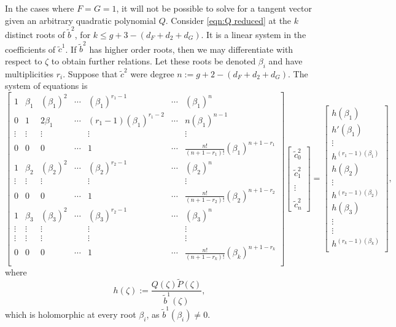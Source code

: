 In the cases where $F=G=1$, it will not be possible to solve for a tangent vector given an arbitrary quadratic polynomial $Q$. Consider \eqref{eqn:Q reduced} at the $k$ distinct roots of $\tilde{b}^2$, for $k \leq g + 3 - (d_F + d_2 + d_G)$. It is a linear system in the coefficients of $\tilde{c}^1$. If $\tilde{b}^2$ has higher order roots, then we may differentiate with respect to $ζ$ to obtain further relations. Let these roots be denoted $β_i$ and have multiplicities $r_i$. Suppose that $\tilde{c}^2$ were degree $n := g + 2 - (d_F + d_2 + d_G)$. The system of equations is
\[
\begin{bmatrix}
1 & β_1 & (β_1)^2 & \cdots & (β_1)^{r_1-1} & \cdots & (β_1)^{n} \\
0 & 1 & 2β_1 & \cdots & (r_1-1)(β_1)^{r_1-2} & \cdots & n(β_1)^{n-1} \\
\vdots & \vdots & \vdots & & \vdots & & \vdots \\
0 & 0 & 0 & \cdots & 1 & \cdots & \frac{n!}{(n+1 - r_1)!}(β_1)^{n+1-r_1} \\
1 & β_2 & (β_2)^2 & \cdots & (β_2)^{r_2-1} & \cdots & (β_2)^{n} \\
\vdots & \vdots & \vdots & & \vdots & & \vdots \\
0 & 0 & 0 & \cdots & 1 & \cdots & \frac{n!}{(n+1 - r_2)!}(β_2)^{n+1-r_2} \\
1 & β_3 & (β_3)^2 & \cdots & (β_3)^{r_2-1} & \cdots & (β_3)^{n} \\
\vdots & \vdots & \vdots & & \vdots & & \vdots \\
\vdots & \vdots & \vdots & & \vdots & & \vdots \\
0 & 0 & 0 & \cdots & 1 & \cdots & \frac{n!}{(n+1 - r_k)!}(β_k)^{n+1-r_k} \\
\end{bmatrix}
\begin{bmatrix}
\tilde{c}^2_0 \\~\\ \tilde{c}^2_1 \\~\\ \vdots \\~\\ \tilde{c}^2_n
\end{bmatrix}
=
\begin{bmatrix}
h(β_1) \\ h'(β_1) \\ \vdots \\ h^{(r_1-1)(β_1)} \\
h(β_2) \\ \vdots \\ h^{(r_2-1)(β_2)} \\
h(β_3) \\ \vdots \\ \vdots \\ h^{(r_k-1)(β_k)} \\
\end{bmatrix},
\]
where
\[
h(ζ) := \frac{Q(ζ)\tilde{P}(ζ)}{\tilde{b}^1(ζ)},
\]
which is holomorphic at every root $β_i$, as $\tilde{b}^1(β_i)\neq 0$.

